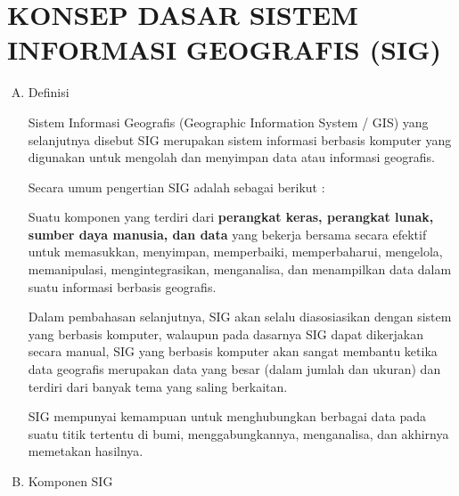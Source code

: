 

\chapter{KONSEP DASAR SISTEM INFORMASI GEOGRAFIS (SIG)}

\begin{enumerate}[A.]
\item{Definisi}

Sistem Informasi Geografis (Geographic Information System / GIS) yang selanjutnya disebut SIG merupakan sistem informasi berbasis komputer yang digunakan untuk mengolah dan menyimpan data atau informasi geografis.

Secara umum pengertian SIG adalah sebagai berikut :
\begin{italicquotes}
Suatu komponen yang terdiri dari \textbf{perangkat keras, perangkat lunak, sumber daya manusia, dan data} yang bekerja bersama secara efektif untuk memasukkan, menyimpan, memperbaiki, memperbaharui, mengelola, memanipulasi, mengintegrasikan, menganalisa, dan menampilkan data dalam suatu informasi berbasis geografis.
\end{italicquotes}

Dalam pembahasan selanjutnya, SIG akan selalu diasosiasikan dengan sistem yang berbasis komputer, walaupun pada dasarnya SIG dapat dikerjakan secara manual, SIG yang berbasis komputer akan sangat membantu ketika data geografis merupakan data yang besar (dalam jumlah dan ukuran) dan terdiri dari banyak tema yang saling berkaitan.

SIG mempunyai kemampuan untuk menghubungkan berbagai data pada suatu titik tertentu di bumi, menggabungkannya, menganalisa, dan akhirnya memetakan hasilnya.

\item{Komponen SIG}
\end{enumerate}
